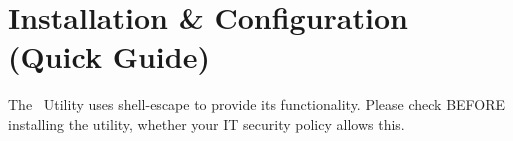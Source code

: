 
\chapter{Installation \& Configuration (Quick Guide)}
	\begin{daWarningBox}
		The \productName~Utility uses shell-escape to provide its functionality. Please check BEFORE installing the utility, whether your IT security policy allows this. 
	\end{daWarningBox}

